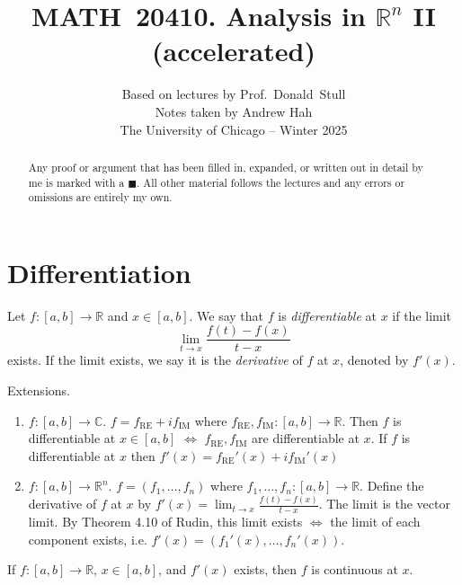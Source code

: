 \documentclass[11pt]{article}
\title{MATH 20410. Analysis in \(\mathbb{R}^n\) II  (accelerated)}
\author{%
  Based on lectures by Prof.\ Donald Stull\\
  {\large Notes taken by Andrew Hah}\\[2ex]
  {\normalsize The University of Chicago – Winter 2025}
}
\date{}  %
\begin{document}
\maketitle
\thispagestyle{empty}

\vspace*{-1em}
\noindent
\begin{abstract} Any proof or argument that has been filled in, expanded, or written out in detail by me is marked with a \(\blacksquare\).  
  All other material follows the lectures and any errors or omissions are entirely my own.
  \end{abstract}

\vspace{2em}
\noindent
\tableofcontents

\newpage

\section{Differentiation}

\begin{definition} Let $f: [a, b] \to \mathbb{R}$ and $x \in [a, b]$. We say that $f$ is \emph{differentiable} at $x$ if the limit $$\lim_{t \to x} \frac{f(t) - f(x)}{t - x}$$exists. If the limit exists, we say it is the \emph{derivative} of $f$ at $x$, denoted by $f'(x)$.
\end{definition}

Extensions. \begin{enumerate}
  \item $f: [a, b] \to \mathbb{C}$. $f = f_{\mathrm{RE}} + i f_{\mathrm{IM}}$ where $f_{\mathrm{RE}},  f_{\mathrm{IM}}: [a, b] \to \mathbb{R}$. 
	Then $f$ is differentiable at $x \in [a, b]$ $\iff$ $f_{\mathrm{RE}},  f_{\mathrm{IM}}$ are differentiable at $x$.
	If $f$ is differentiable at $x$ then $f'(x) = f_{\mathrm{RE}}'(x) + i  f_{\mathrm{IM}}'(x)$
  \item $f: [a, b] \to \mathbb{R}^n$. $f = (f_1, \dots, f_n)$ where $f_1, \dots, f_n: [a, b] \to \mathbb{R}$.
	Define the derivative of $f$ at $x$ by $f'(x) = \lim_{t \to x} \frac{f(t) - f(x)}{t - x}$. The limit is the vector limit. 
	By Theorem 4.10 of Rudin, this limit exists $\iff$ the limit of each component exists, i.e. $f'(x) = (f_1'(x), \dots, f_n'(x))$.
    \end{enumerate}
     
      \begin{theorem} If $f: [a, b] \to \mathbb{R}$, $x \in [a, b]$, and $f'(x)$ exists, then $f$ is continuous at $x$.
      \end{theorem}
\end{document}

